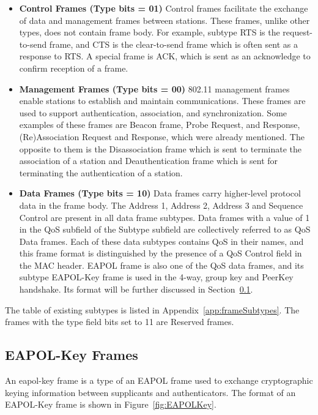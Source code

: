 \begin{itemize}
\item \textbf{Control Frames (Type bits = 01)}
Control frames facilitate the exchange of data and management frames between stations. These frames, unlike other types, does not contain frame body. For example, subtype RTS is the request-to-send frame, and CTS is the clear-to-send frame which is often sent as a response to RTS. A special frame is ACK, which is sent as an acknowledge to confirm reception of a frame.

\item \textbf{Management Frames (Type bits = 00)}
802.11 management frames enable stations to establish and maintain communications. These frames are used to support authentication, association, and synchronization. Some examples of these frames are Beacon frame, Probe Request, and Response, (Re)Association Request and Response,  which were already mentioned. The opposite to them is the Disassociation frame which is sent to terminate the association of a station and Deauthentication frame which is sent for terminating the authentication of a station. 

\item \textbf{Data Frames (Type bits = 10)}
Data frames carry higher-level protocol data in the frame body. The Address 1, Address 2, Address 3 and Sequence Control are present in all data frame subtypes. Data frames with a value of 1 in the QoS subfield of the Subtype subfield are collectively referred to as QoS Data frames. Each of these data subtypes contains QoS in their names, and this frame format is distinguished by the presence of a QoS Control field in the MAC header. EAPOL frame is also one of the QoS data frames, and its subtype EAPOL-Key frame is used in the 4-way, group key and PeerKey handshake. Its format will be further discussed in Section~\ref{sub:eapolKeyFrames}.
\end{itemize}

The table of existing subtypes is listed in Appendix~\ref{app:frameSubtypes}. The frames with the type field bits set to 11 are Reserved frames.

\subsection{EAPOL-Key Frames}
\label{sub:eapolKeyFrames}

An eapol-key frame is a type of an EAPOL frame used to exchange cryptographic keying information between supplicants and authenticators. The format of an EAPOL-Key frame is shown in Figure~\ref{fig:EAPOLKey}.

